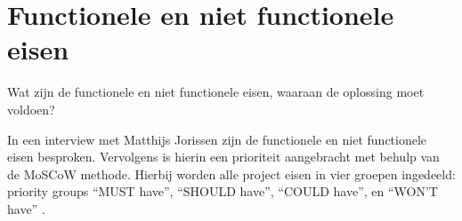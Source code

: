 \section{Functionele en niet functionele eisen}
\label{sec:deelvraag1}

Wat zijn de functionele en niet functionele eisen, waaraan de oplossing moet voldoen?

In een interview met Matthijs Jorissen zijn de functionele en niet functionele eisen besproken. Vervolgens is hierin een prioriteit aangebracht met behulp van de MoSCoW methode. Hierbij worden alle project eisen in vier groepen ingedeeld: priority groups “MUST have”, “SHOULD have”, “COULD have”, en “WON’T have” \textcite{ma2009effectiveness}.

\begin{comment}
Een functionele eis kan gezien worden als iets dat de gebruiker nodig heeft om het doel te bereiken of een bepaalde voorwaarde waaraan de oplossing moet voldoen.

Een non functionele eis is een beperking doe wordt opgelegd op een mogelijke oplossing, met het doel om functionele eisen te behalen of het doel van het project.
\end{comment}

